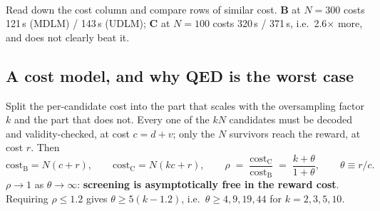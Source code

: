 \documentclass[11pt]{article}
\begin{document}
\begin{table}[htbp]
\centering
\footnotesize
\setlength{\tabcolsep}{4pt}
\\[0.4em] \begin{minipage}{0.92\textwidth}\footnotesize Read down the cost column and compare rows of similar cost. \textbf{B} at $N=300$ costs 121\,s (MDLM) / 143\,s (UDLM); \textbf{C} at $N=100$ costs 320\,s / 371\,s, i.e.\ 2.6$\times$ more, and does not clearly beat it.\end{minipage}
\caption{UDLM: hits against measured cost, ordered by cost. Each row takes the best hits over $\lambda$ and mixture mode at that $(\mathrm{arm}, N)$, i.e.\ it assumes the tilt is tuned. Cost is the mean wall clock of the 8 cells behind the row.}
\label{tab:ov-cost-UDLM}
\end{table}

\subsection{A cost model, and why QED is the worst case}

Split the per-candidate cost into the part that scales with the oversampling
factor $k$ and the part that does not. Every one of the $kN$ candidates must be
decoded and validity-checked, at cost $c = d + v$; only the $N$ survivors reach
the reward, at cost $r$. Then
\[
  \mathrm{cost}_{\mathrm{B}} = N (c + r), \qquad
  \mathrm{cost}_{\mathrm{C}} = N (k c + r), \qquad
  \rho \;=\; \frac{\mathrm{cost}_{\mathrm{C}}}{\mathrm{cost}_{\mathrm{B}}}
        \;=\; \frac{k + \theta}{1 + \theta},
  \qquad \theta \equiv r / c .
\]
$\rho \to 1$ as $\theta \to \infty$: \textbf{screening is asymptotically free in
the reward cost}. Requiring $\rho \leq 1.2$ gives $\theta \geq 5(k - 1.2)$, i.e.\
$\theta \geq 4, 9, 19, 44$ for $k = 2, 3, 5, 10$.
\end{document}
